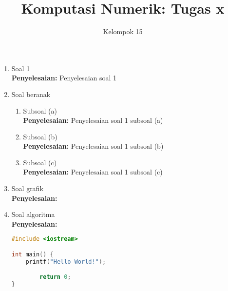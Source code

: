 \documentclass{article}
\title{\textbf{Komputasi Numerik: Tugas x}}
\author{Kelompok 15}
\date{}
\newcommand{\penyelesaian}{\textbf{Penyelesaian: }}
\begin{document}
\maketitle

\begin{enumerate}
    \item Soal 1 \\
    \penyelesaian Penyelesaian soal 1

    \item Soal beranak
    \begin{enumerate}
        \item Subsoal (a) \\
        \penyelesaian Penyelesaian soal 1 subsoal (a)

        \item Subsoal (b) \\
        \penyelesaian Penyelesaian soal 1 subsoal (b)

        \item Subsoal (c) \\
        \penyelesaian  Penyelesaian soal 1 subsoal (c)
    \end{enumerate}

    \item Soal grafik \\
    \penyelesaian \\
    \begin{center}
    \end{center}

    \item Soal algoritma \\
    \penyelesaian
    \begin{lstlisting}[style=code,language=c]
#include <iostream>

int main() {
    printf("Hello World!");

        return 0;
}
    \end{lstlisting}
\end{enumerate}
\end{document}
